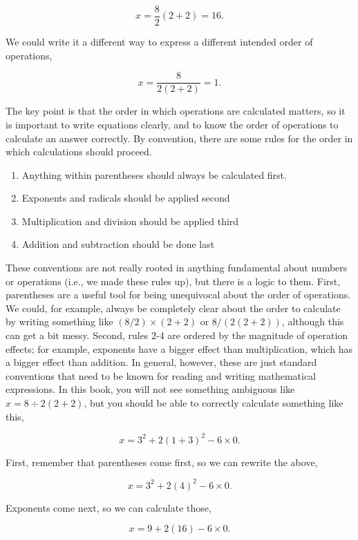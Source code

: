 \documentclass[
  openany]{krantz}
\providecommand{\tightlist}{%
  \setlength{\itemsep}{0pt}\setlength{\parskip}{0pt}}
\begin{document}
\[x = \frac{8}{2}\left(2 + 2\right) = 16.\]

We could write it a different way to express a different intended order of operations,

\[x = \frac{8}{2(2+2)} = 1.\]

The key point is that the order in which operations are calculated matters, so it is important to write equations clearly, and to know the order of operations to calculate an answer correctly.
By convention, there are some rules for the order in which calculations should proceed.

\begin{enumerate}
\def\labelenumi{\arabic{enumi}.}
\tightlist
\item
  Anything within parentheses should always be calculated first.
\item
  Exponents and radicals should be applied second
\item
  Multiplication and division should be applied third
\item
  Addition and subtraction should be done last
\end{enumerate}

These conventions are not really rooted in anything fundamental about numbers or operations (i.e., we made these rules up), but there is a logic to them.
First, parentheses are a useful tool for being unequivocal about the order of operations.
We could, for example, always be completely clear about the order to calculate by writing something like \((8/2) \times (2+2)\) or \(8 / (2(2 + 2))\), although this can get a bit messy.
Second, rules 2-4 are ordered by the magnitude of operation effects; for example, exponents have a bigger effect than multiplication, which has a bigger effect than addition.
In general, however, these are just standard conventions that need to be known for reading and writing mathematical expressions.
In this book, you will not see something ambiguous like \(x = 8 \div 2\left(2+2\right)\), but you should be able to correctly calculate something like this,

\[x = 3^{2} + 2\left(1 + 3\right)^{2} - 6 \times 0.\]

First, remember that parentheses come first, so we can rewrite the above,

\[x = 3^{2} + 2\left(4\right)^{2} - 6 \times 0.\]

Exponents come next, so we can calculate those,

\[x = 9 + 2\left(16\right) - 6 \times 0.\]
\end{document}
